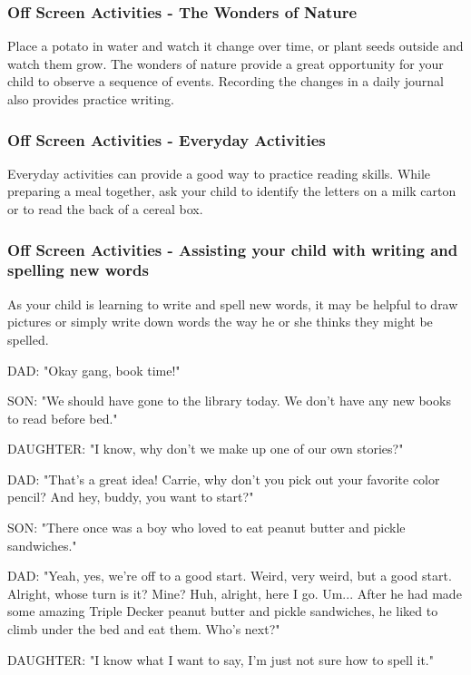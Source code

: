 \subsubsection{Off Screen Activities - The Wonders of Nature}

Place a potato in water and watch it change over time, or plant seeds outside and watch them grow.
The wonders of nature provide a great opportunity for your child to observe a sequence of events.
Recording the changes in a daily journal also provides practice writing.

\subsubsection{Off Screen Activities - Everyday Activities}

Everyday activities can provide a good way to practice reading skills.
While preparing a meal together, ask your child to identify the letters on a milk carton or to read the back of a cereal box.

\subsubsection{Off Screen Activities - Assisting your child with writing and spelling new words}

As your child is learning to write and spell new words, it may be helpful to draw pictures or simply write down words the way he or she thinks they might be spelled.

DAD: "Okay gang, book time!"

SON: "We should have gone to the library today. We don't have any new books to read before bed."

DAUGHTER: "I know, why don't we make up one of our own stories?"

DAD: "That's a great idea! Carrie, why don't you pick out your favorite color pencil? And hey, buddy, you want to start?"

SON: "There once was a boy who loved to eat peanut butter and pickle sandwiches."

DAD: "Yeah, yes, we're off to a good start.
Weird, very weird, but a good start. Alright, whose turn is it?
Mine? Huh, alright, here I go.
Um...
After he had made some amazing Triple Decker peanut butter and pickle sandwiches, he liked to climb under the bed and eat them.
Who's next?"

DAUGHTER: "I know what I want to say, I'm just not sure how to spell it."

